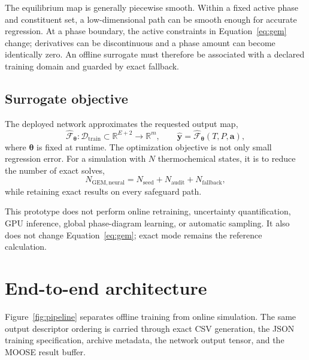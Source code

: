\documentclass[11pt]{article}
\newcommand{\R}{\mathbb{R}}
\begin{document}
The equilibrium map is generally piecewise smooth.  Within a fixed active phase and constituent
set, a low-dimensional path can be smooth enough for accurate regression.  At a phase boundary,
the active constraints in Equation~\eqref{eq:gem} change; derivatives can be discontinuous and a
phase amount can become identically zero.  An offline surrogate must therefore be associated with
a declared training domain and guarded by exact fallback.

\subsection{Surrogate objective}

The deployed network approximates the requested output map,
\begin{equation}
  \widehat{\mathcal{F}}_{\boldsymbol{\theta}}:
  \mathcal{D}_{\mathrm{train}}\subset\R^{E+2}\longrightarrow\R^m,
  \qquad
  \widehat{\boldsymbol{y}}
  =\widehat{\mathcal{F}}_{\boldsymbol{\theta}}(T,P,\boldsymbol{a}),
  \label{eq:surrogate-map}
\end{equation}
where \(\boldsymbol{\theta}\) is fixed at runtime.  The optimization objective is not only small
regression error.  For a simulation with \(N\) thermochemical states, it is to reduce the number
of exact solves,
\begin{equation}
  N_{\mathrm{GEM,neural}}
  =N_{\mathrm{seed}}+N_{\mathrm{audit}}+N_{\mathrm{fallback}},
  \label{eq:exact-count}
\end{equation}
while retaining exact results on every safeguard path.

This prototype does not perform online retraining, uncertainty quantification, GPU inference,
global phase-diagram learning, or automatic sampling.  It also does not change
Equation~\eqref{eq:gem}; exact mode remains the reference calculation.

\section{End-to-end architecture}

Figure~\ref{fig:pipeline} separates offline training from online simulation.  The same output
descriptor ordering is carried through exact CSV generation, the JSON training specification,
archive metadata, the network output tensor, and the MOOSE result buffer.
\end{document}
